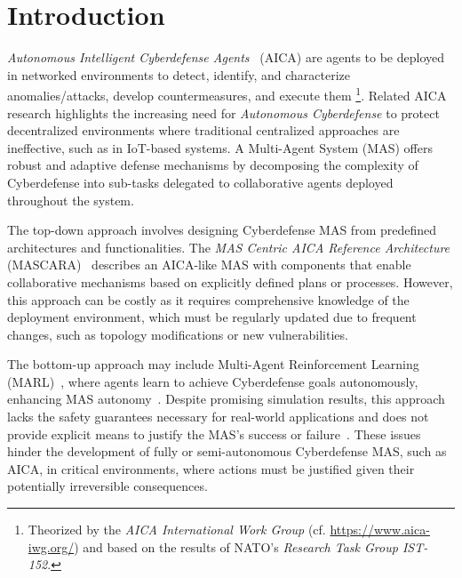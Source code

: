 



\section{Introduction}
\label{sec:introduction}

\textit{Autonomous Intelligent Cyberdefense Agents}~\cite{Kott2023} (AICA) are agents to be deployed in networked environments to detect, identify, and characterize anomalies/attacks, develop countermeasures, and execute them
%
\footnote{
    Theorized by the \textit{AICA International Work Group} (cf. \url{https://www.aica-iwg.org/}) and based on the results of NATO's \textit{Research Task Group IST-152}.
}.
Related AICA research highlights the increasing need for \textit{Autonomous Cyberdefense} to protect decentralized environments where traditional centralized approaches are ineffective, such as in IoT-based systems. A Multi-Agent System (MAS) offers robust and adaptive defense mechanisms by decomposing the complexity of Cyberdefense into sub-tasks delegated to collaborative agents deployed throughout the system.

The top-down approach involves designing Cyberdefense MAS from predefined architectures and functionalities. The \textit{MAS Centric AICA Reference Architecture} (MASCARA)~\cite{Kott2023} describes an AICA-like MAS with components that enable collaborative mechanisms based on explicitly defined plans or processes. However, this approach can be costly as it requires comprehensive knowledge of the deployment environment, which must be regularly updated due to frequent changes, such as topology modifications or new vulnerabilities.

The bottom-up approach may include Multi-Agent Reinforcement Learning (MARL)~\cite{Albrecht2024}, where agents learn to achieve Cyberdefense goals autonomously, enhancing MAS autonomy~\cite{hammar_stadle4_noms_23}. Despite promising simulation results, this approach lacks the safety guarantees necessary for real-world applications and does not provide explicit means to justify the MAS's success or failure~\cite{dulacarnold2019}. These issues hinder the development of fully or semi-autonomous Cyberdefense MAS, such as AICA, in critical environments, where actions must be justified given their potentially irreversible consequences.


